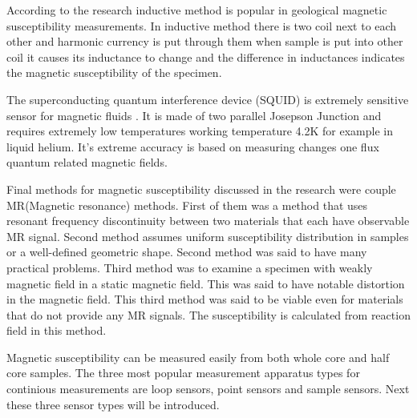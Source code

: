 \documentclass[12pt,a4paper,oneside,pdftex]{report}
\begin{document}

According to the research\cite{Marcon2012} inductive method is popular in geological magnetic susceptibility
measurements. In inductive method there is two coil next to each other and harmonic currency is put through them
when sample is put into other coil it causes its inductance to change and the difference in inductances indicates
the magnetic susceptibility of the specimen.\cite{Marcon2012}             

The superconducting quantum interference device (SQUID) is extremely sensitive sensor for magnetic fluids
\cite{Marcon2012}. It is made of two parallel Josepson Junction and requires extremely low temperatures
working temperature 4.2K for example in liquid helium\cite{Marcon2012}. It's extreme accuracy is based on measuring 
changes one flux quantum related magnetic fields\cite{Marcon2012}.


Final methods for magnetic susceptibility discussed in the research\cite{Marcon2012} were couple MR(Magnetic
resonance) methods. First of them was a method that uses resonant frequency discontinuity between two materials
that each have observable MR signal. Second method assumes uniform susceptibility distribution in samples or a
well-defined geometric shape. Second method was said to have many practical problems. Third method was to examine
a specimen with weakly magnetic field in a static magnetic field. This was said to have notable distortion in the 
magnetic field. This third method was said to be viable even for materials that do not provide any MR signals.
The susceptibility is calculated from reaction field in this method.\cite{Marcon2012}

Magnetic susceptibility can be measured easily from both whole core and half core samples. The three most popular 
measurement apparatus types for continious measurements are loop sensors, point sensors and sample sensors. Next
these three sensor types will be introduced.
\end{document}
